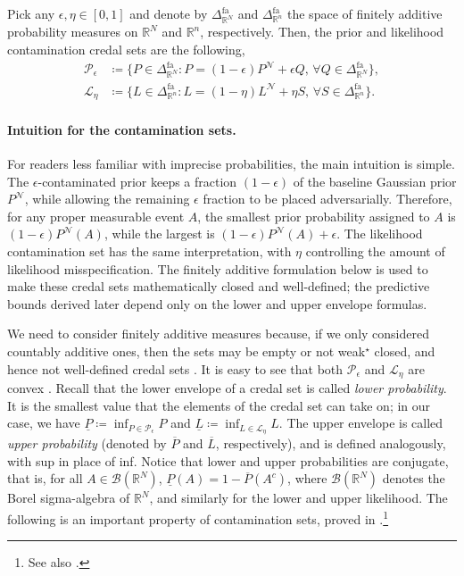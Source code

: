 \documentclass[12pt, english, oneside, a4paper]{article}
\begin{document}
Pick any $\epsilon,\eta\in [0,1]$ and denote by $\Delta^\text{fa}_{\mathbb{R}^N}$ and $\Delta^\text{fa}_{\mathbb{R}^n}$ the space of finitely additive probability measures on $\mathbb{R}^N$ and $\mathbb{R}^n$, respectively. Then, the prior and likelihood contamination credal sets are the following,
\begin{align*}
    \mathcal{P}_\epsilon &\coloneqq \{P \in \Delta_{\mathbb{R}^N}^\text{fa} : P=(1-\epsilon)P^\mathcal{N} + \epsilon Q \text{, } \forall Q \in \Delta_{\mathbb{R}^N}^\text{fa}\},\\
    \mathcal{L}_\eta &\coloneqq \{L \in \Delta_{\mathbb{R}^n}^\text{fa} : L=(1-\eta)L^\mathcal{N} + \eta S \text{, } \forall S \in \Delta_{\mathbb{R}^n}^\text{fa}\}.
\end{align*}

\paragraph{Intuition for the contamination sets.}
For readers less familiar with imprecise probabilities, the main intuition is simple. The \(\epsilon\)-contaminated prior keeps a fraction \((1-\epsilon)\) of the baseline Gaussian prior \(P^{\mathcal N}\), while allowing the remaining \(\epsilon\) fraction to be placed adversarially. Therefore, for any proper measurable event \(A\), the smallest prior probability assigned to \(A\) is \((1-\epsilon)P^{\mathcal N}(A)\), while the largest is \((1-\epsilon)P^{\mathcal N}(A)+\epsilon\). The likelihood contamination set has the same interpretation, with \(\eta\) controlling the amount of likelihood misspecification. The finitely additive formulation below is used to make these credal sets mathematically closed and well-defined; the predictive bounds derived later depend only on the lower and upper envelope formulas.
 
 We need to consider finitely additive measures because, if we only considered countably additive ones, then the sets may be empty or not weak$^\star$ closed, and hence not well-defined credal sets \citep[Section 3]{caprio2025optimaltransportepsiloncontaminatedcredal}. It is easy to see that both $\mathcal{P}_\epsilon$ and $\mathcal{L}_\eta$ are convex \citep{marinacci2}. Recall that the lower envelope of a credal set is called {\em lower probability}. It is the smallest value that the elements of the credal set can take on; in our case, we have $\underline{P}\coloneqq \inf_{P\in\mathcal{P}_\epsilon} P$ and $\underline{L}\coloneqq \inf_{L\in\mathcal{L}_\eta} L$. The upper envelope is called {\em upper probability} (denoted by $\overline{P}$ and $\overline{L}$, respectively), and is defined analogously, with sup in place of inf. Notice that lower and upper probabilities are conjugate, that is, for all $A \in \mathcal{B}(\mathbb{R}^N)$, $\underline{P}(A)=1-\overline{P}(A^c)$, where $\mathcal{B}(\mathbb{R}^N)$ denotes the Borel sigma-algebra of $\mathbb{R}^N$, and similarly for the lower and upper likelihood. 
 The following is an important property of contamination sets, proved in \citet[Lemma 5]{caprio2025optimaltransportepsiloncontaminatedcredal}.\footnote{See also \citet{wasserman,walley}.}
\end{document}

